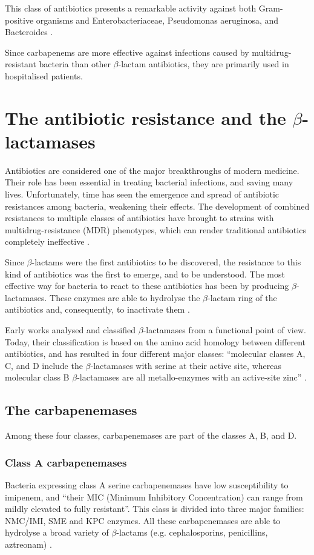 \documentclass[11pt]{report}
\begin{document}
This class of antibiotics presents a remarkable activity against both Gram-positive organisms and Enterobacteriaceae, Pseudomonas aeruginosa, and Bacteroides \cite{Neu1985}.

Since carbapenems are more effective against infections caused by multidrug-resistant bacteria than other $\beta$-lactam antibiotics, they are primarily used in hospitalised patients.

\chapter{The antibiotic resistance and the $\beta$-lactamases}

Antibiotics are considered one of the major breakthroughs of modern medicine.
Their role has been essential in treating bacterial infections, and saving many lives.
Unfortunately, time has seen the emergence and spread of antibiotic resistances among bacteria, weakening their effects.
The development of combined resistances to multiple classes of antibiotics have brought to strains with multidrug-resistance (MDR) phenotypes, which can render traditional antibiotics completely ineffective \cite{Rossolini2014}.

Since $\beta$-lactams were the first antibiotics to be discovered, the resistance to this kind of antibiotics was the first to emerge, and to be understood.
The most effective way for bacteria to react to these antibiotics has been by producing $\beta$-lactamases.
These enzymes are able to hydrolyse the $\beta$-lactam ring of the antibiotics and, consequently, to inactivate them \cite{kong2010beta}.

Early works analysed and classified $\beta$-lactamases from a functional point of view.
Today, their classification is based on the amino acid homology between different antibiotics, and has resulted in four different major classes: “molecular classes A, C, and D include the $\beta$-lactamases with serine at their active site, whereas molecular class B $\beta$-lactamases are all metallo-enzymes with an active-site zinc” \cite{Queenan2007}.

\section{The carbapenemases}
Among these four classes, carbapenemases are part of the classes A, B, and D.

\subsection{Class A carbapenemases}
Bacteria expressing class A serine carbapenemases have low susceptibility to imipenem, and “their MIC (Minimum Inhibitory Concentration) can range from mildly elevated to fully resistant”.
This class is divided into three major families: NMC/IMI, SME and KPC enzymes.
All these carbapenemases are able to hydrolyse a broad variety of $\beta$-lactams (e.g. cephalosporins, penicillins, aztreonam) \cite{kong2010beta} \cite{Queenan2007}.
\end{document}
